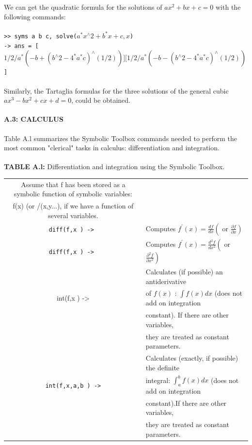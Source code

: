 \documentclass[../main.tex]{subfiles}
\begin{document}
\\
\\
\newpage
We can get the quadratic formula for the solutions of $ax^2
 +bx + c = 0$ with the 
following commands: 
\\
\\
\texttt{>> syms a b c, solve($a^*x^{\wedge}2+b^*x+c,x$) }\\
\texttt{-> ans = [ $1/2/a^*(-b+(b^{\wedge}
2-4^*a^*c)^{\wedge}
(1/2))] [ 1/2/a^*(-b-(b^{\wedge}
2-4^*a^*c)^{\wedge}
(1/2))$] }
\\
\\
Similarly, the Tartaglia formulas for the three solutions of the general cubic 
$ax^3-bx^2+cx+d=0$, could be obtained.
\\
\\
\textbf{A.3: CALCULUS }
\\
\\
Table A.l summarizes the Symbolic Toolbox commands needed to perform the 
most common "clerical" tasks in calculus: differentiation and integration. 
\\
\\
\textbf{TABLE A.l:} Differentiation and integration using the Symbolic Toolbox. 
\begin{center}
\begin{tabular}{|c|l|}
\hline
Assume that f has been stored as a symbolic function of symbolic variables: \\f(x) (or /(x,y...), if we have a function of several variables. \\
\hline
\texttt{diff(f,x ) -> }&Computes $f^{\prime}(x)=\frac{d f}{d x}\left(\right.$ or $\left.\frac{\partial f}{\partial x}\right)$\\
\hline
\texttt{diff(f,x ) -> }&Computes $f^{\prime}(x)=\frac{d^2f}{dx^2}\left(\right.$ or $\left.\frac{\partial^2 f}{\partial x^2}\right)$\\
\hline
\texttt&Calculates (if possible) an antiderivative\\
{int(f,x ) -> }& of $f(x)$ : $\int f(x) d x$ (does not add on integration\\
&constant). If there are other variables,\\
& they are treated as constant parameters.\\
\hline
&Calculates (exactly, if possible) the definite\\
\texttt{int(f,x,a,b ) ->}& integral: $\int_{a}^{b} f(x) d x$ (does not add on integration\\
& constant).If there are other variables,\\
& they are treated as constant parameters.\\
	\hline
\end{tabular}
\end{center}
\end{document}
